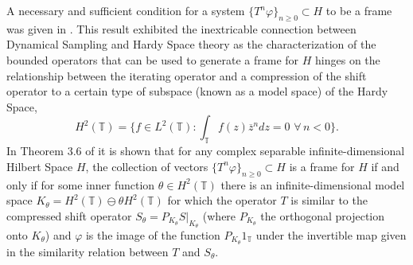 \documentclass[12pt,reqno]{amsart}
\theoremstyle{definition}
\theoremstyle{definition}
\numberwithin{equation}{section}
\begin{document}
 \quad A necessary and sufficient condition for a system $\{T^n \varphi\}_{n \geq 0} \subset H$ to be a frame was given in \cite{CHP20}. This result exhibited the inextricable connection between Dynamical Sampling and Hardy Space theory as the characterization of the bounded operators that can be used to generate a frame for $H$ hinges on the relationship between the iterating operator and a compression of the shift operator to a certain type of subspace (known as a model space) of the Hardy Space, \begin{displaymath}
H^2(\mathbb{T}) = \{f \in L^2(\mathbb{T}) : \int_{\mathbb{T}} f(z) \overline{z}^n dz = 0 \, \,  \forall \, n<0 \}.
 \end{displaymath}
 In Theorem 3.6 of \cite{CHP20} it is shown that for any complex separable infinite-dimensional Hilbert Space $H$, the collection of vectors $\{T^{n}\varphi\}_{n \geq 0} \subset H$ is a frame for $H$ if and only if for some inner function $\theta \in H^2(\mathbb{T})$ there is an infinite-dimensional model space $K_\theta =  H^2(\mathbb{T}) \ominus \theta H^2(\mathbb{T})$ for which the operator $T$ is similar to the compressed shift operator $S_{\theta} = P_{K_{\theta}} \left.S\right|_{K_{\theta}}$ (where $P_{K_{\theta}}$ the orthogonal projection onto $K_{\theta}$) and $\varphi$ is the image of the function $P_{K_{\theta}}1_{\mathbb{T}}$ under the invertible map given in the similarity relation between $T$ and $S_{\theta}$. %

\end{document}
